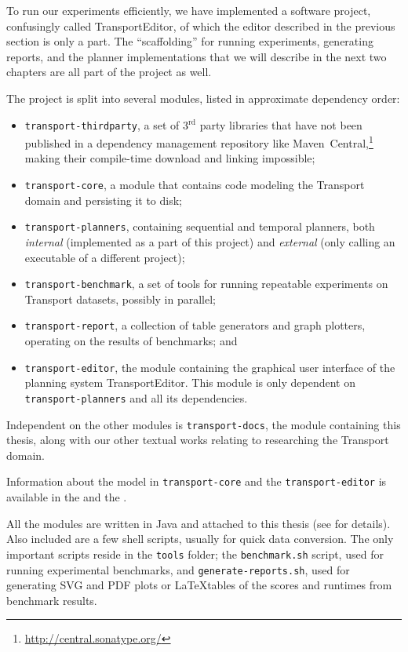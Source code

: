 To run our experiments efficiently, we have implemented a software project,
confusingly called TransportEditor, of which the editor described in
the previous section is only a part.
The ``scaffolding'' for running experiments, generating reports, and the planner implementations that we will describe in the next two chapters are all part
of the project as well.

The project is split into several modules, listed in approximate dependency order:
\begin{itemize}
\item \texttt{transport-thirdparty}, a set of 3$^\textrm{rd}$ party libraries
that have not been published in a dependency management repository like Maven~Central,\footnote{\url{http://central.sonatype.org/}}
making their compile-time download and linking impossible;
\item \texttt{transport-core}, a module that contains code modeling the Transport
domain and persisting it to disk;
\item \texttt{transport-planners}, containing sequential and temporal planners, both \textit{internal} (implemented as a part of this project) and \textit{external}
(only calling an executable of a different project);
\item \texttt{transport-benchmark}, a set of tools for running repeatable
experiments on Transport datasets, possibly in parallel;
\item \texttt{transport-report}, a collection of table generators and graph plotters,
operating on the results of benchmarks; and
\item \texttt{transport-editor}, the module containing the graphical user interface
of the planning system TransportEditor. This module is only dependent
on \texttt{transport-planners} and all its dependencies.
\end{itemize}
Independent on the other modules is \texttt{transport-docs},
the module containing this thesis,
along with our other textual works relating to researching the Transport domain.

Information about the model in \texttt{transport-core} and the \texttt{transport-editor} is available in the  and the .

All the modules are written in Java and attached to this thesis (see  for details). Also included are a few shell scripts, usually for quick
data conversion. The only important scripts reside in the \texttt{tools} folder;
the \texttt{benchmark.sh} script, used for running experimental benchmarks,
and \texttt{generate-reports.sh}, used for generating SVG and PDF plots or \LaTeX tables of the scores and runtimes from benchmark results.

